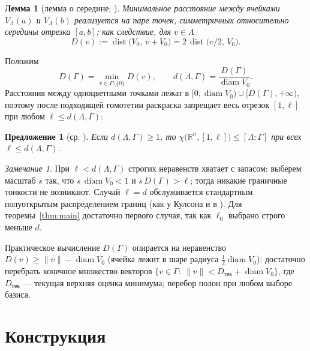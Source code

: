 \documentclass[12pt]{article}
\newtheorem{lemma}{Лемма}
\newtheorem{proposition}{Предложение}
\theoremstyle{definition}
\theoremstyle{remark}
\newtheorem{remark}{Замечание}
\newcommand{\R}{\mathbb{R}}
\newcommand{\diam}{\operatorname{diam}}
\newcommand{\dist}{\operatorname{dist}}
\begin{document}
\begin{lemma}[лемма о середине; {\cite[лемма~2]{Ivanov2011}}]\label{lem:mid}
Минимальное расстояние между ячейками $V_\Lambda(a)$ и $V_\Lambda(b)$
реализуется на паре точек, симметричных относительно середины отрезка $[a,b]$;
как следствие, для $v\in\Lambda$
\[
D(v):=\dist\bigl(V_0,\,v+V_0\bigr)=2\,\dist\bigl(v/2,\,V_0\bigr).
\]
\end{lemma}

Положим
\[
D(\Gamma)=\min_{v\in\Gamma\setminus\{0\}}D(v),\qquad
d(\Lambda,\Gamma)=\frac{D(\Gamma)}{\diam V_0}.
\]
Расстояния между одноцветными точками лежат в
$[0,\diam V_0)\cup[D(\Gamma),+\infty)$, поэтому после подходящей гомотетии
раскраска запрещает весь отрезок $[1,\ell]$ при любом
$\ell\le d(\Lambda,\Gamma)$:

\begin{proposition}[{ср. \cite[Prop.~5]{ABPR}}]\label{prop:crit}
Если $d(\Lambda,\Gamma)\ge 1$, то
$\chi\bigl(\R^n,[1,\ell]\bigr)\le[\Lambda:\Gamma]$ при всех
$\ell\le d(\Lambda,\Gamma)$.
\end{proposition}

\begin{remark}\label{rem:boundary}
При $\ell<d(\Lambda,\Gamma)$ строгих неравенств хватает с запасом: выберем
масштаб $s$ так, что $s\,\diam V_0<1$ и $s\,D(\Gamma)>\ell$; тогда никакие
граничные тонкости не возникают. Случай $\ell=d$ обслуживается стандартным
полуоткрытым распределением границ (как у Кулсона \cite{Coulson} и в
\cite[доказательство Prop.~5]{ABPR}). Для теоремы~\ref{thm:main} достаточно
первого случая, так как $\ell_0$ выбрано строго меньше $d$.
\end{remark}

Практическое вычисление $D(\Gamma)$ опирается на неравенство
$D(v)\ge\|v\|-\diam V_0$ (ячейка лежит в шаре радиуса $\tfrac12\diam V_0$):
достаточно перебрать конечное множество векторов
$\{v\in\Gamma:\ \|v\|<D_{\text{тек}}+\diam V_0\}$, где $D_{\text{тек}}$ ---
текущая верхняя оценка минимума; перебор полон при любом выборе базиса.

\section{Конструкция}\label{sec:construction}
\end{document}
